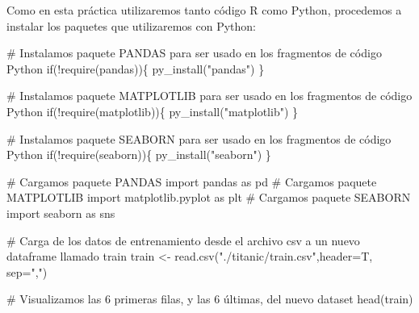 \documentclass[
]{article}
\newenvironment{Shaded}{\begin{snugshade}}{\end{snugshade}}
\newcommand{\CommentTok}[1]{\textcolor[rgb]{0.50,0.62,0.50}{#1}}
\newcommand{\ControlFlowTok}[1]{\textcolor[rgb]{0.94,0.87,0.69}{#1}}
\newcommand{\DataTypeTok}[1]{\textcolor[rgb]{0.87,0.87,0.75}{#1}}
\newcommand{\ImportTok}[1]{\textcolor[rgb]{0.80,0.80,0.80}{#1}}
\newcommand{\KeywordTok}[1]{\textcolor[rgb]{0.94,0.87,0.69}{#1}}
\newcommand{\NormalTok}[1]{\textcolor[rgb]{0.80,0.80,0.80}{#1}}
\newcommand{\OperatorTok}[1]{\textcolor[rgb]{0.94,0.94,0.82}{#1}}
\newcommand{\StringTok}[1]{\textcolor[rgb]{0.80,0.58,0.58}{#1}}
\begin{document}
Como en esta práctica utilizaremos tanto código R como Python,
procedemos a instalar los paquetes que utilizaremos con Python:

\begin{Shaded}
\begin{Highlighting}[]
\CommentTok{# Instalamos paquete PANDAS para ser usado en los fragmentos de código Python}
\ControlFlowTok{if}\NormalTok{(}\OperatorTok{!}\KeywordTok{require}\NormalTok{(pandas))\{}
    \KeywordTok{py_install}\NormalTok{(}\StringTok{"pandas"}\NormalTok{)}
\NormalTok{\}}

\CommentTok{# Instalamos paquete MATPLOTLIB para ser usado en los fragmentos de código Python}
\ControlFlowTok{if}\NormalTok{(}\OperatorTok{!}\KeywordTok{require}\NormalTok{(matplotlib))\{}
    \KeywordTok{py_install}\NormalTok{(}\StringTok{"matplotlib"}\NormalTok{)}
\NormalTok{\}}

\CommentTok{# Instalamos paquete SEABORN para ser usado en los fragmentos de código Python}
\ControlFlowTok{if}\NormalTok{(}\OperatorTok{!}\KeywordTok{require}\NormalTok{(seaborn))\{}
    \KeywordTok{py_install}\NormalTok{(}\StringTok{"seaborn"}\NormalTok{)}
\NormalTok{\}}
\end{Highlighting}
\end{Shaded}

\begin{Shaded}
\begin{Highlighting}[]

\CommentTok{# Cargamos paquete PANDAS }
\ImportTok{import}\NormalTok{ pandas }\ImportTok{as}\NormalTok{ pd}
\CommentTok{# Cargamos paquete MATPLOTLIB }
\ImportTok{import}\NormalTok{ matplotlib.pyplot }\ImportTok{as}\NormalTok{ plt}
\CommentTok{# Cargamos paquete SEABORN }
\ImportTok{import}\NormalTok{ seaborn }\ImportTok{as}\NormalTok{ sns}
\end{Highlighting}
\end{Shaded}

\begin{Shaded}
\begin{Highlighting}[]
\CommentTok{# Carga de los datos de entrenamiento desde el archivo csv a un nuevo dataframe llamado train}
\NormalTok{train <-}\StringTok{ }\KeywordTok{read.csv}\NormalTok{(}\StringTok{"./titanic/train.csv"}\NormalTok{,}\DataTypeTok{header=}\NormalTok{T, }\DataTypeTok{sep=}\StringTok{","}\NormalTok{)}

\CommentTok{# Visualizamos las 6 primeras filas, y las 6 últimas, del nuevo dataset}
\KeywordTok{head}\NormalTok{(train)}
\end{Highlighting}
\end{Shaded}
\end{document}
